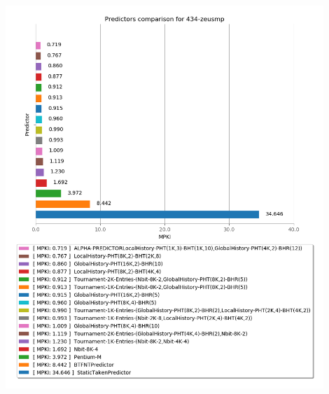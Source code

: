    \begin{minipage}{\textwidth}
      \begin{center}
         \\
         \vspace{3mm}
         \includegraphics[width=0.9\textwidth, frame]{./graphs/4-5/434-zeusmp.png}
         \vspace{6mm}
      \end{center}
   \end{minipage}

